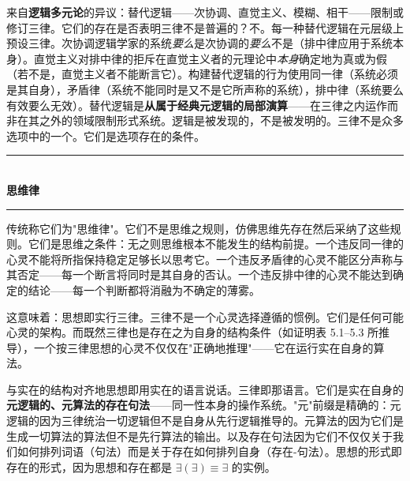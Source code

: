 \documentclass[10pt, openany, oneside]{book}
\renewcommand{\normalsize}{\fontsize{10}{13}\selectfont}
\begin{document}
来自\textbf{逻辑多元论}的异议：替代逻辑——次协调、直觉主义、模糊、相干——限制或修订三律。它们的存在是否表明三律不是普遍的？不。每一种替代逻辑在元层级上预设三律。次协调逻辑学家的系统\textit{要么}是次协调的\textit{要么}不是（排中律应用于系统本身）。直觉主义对排中律的拒斥在直觉主义者的元理论中\textit{本身}确定地为真或为假（若不是，直觉主义者不能断言它）。构建替代逻辑的行为使用同一律（系统必须是其自身），矛盾律（系统不能同时是又不是它所声称的系统），排中律（系统要么有效要么无效）。替代逻辑是\textbf{从属于经典元逻辑的局部演算}——在三律之内运作而非在其之外的领域限制形式系统。逻辑是被发现的，不是被发明的。三律不是众多选项中的一个。它们是选项存在的条件。

\vspace{1.5em}


\begin{center}
    \rule{0.3\textwidth}{0.4pt}\\[0.5em]
    {\normalsize\bfseries\scshape 思维律}\\[0.3em]
    \rule{0.3\textwidth}{0.4pt}
\end{center}

\vspace{1em}

\noindent 传统称它们为"思维律"。它们不是思维之规则，仿佛思维先存在然后采纳了这些规则。它们是思维之条件：无之则思维根本不能发生的结构前提。一个违反同一律的心灵不能将所指保持稳定足够长以思考它。一个违反矛盾律的心灵不能区分声称与其否定——每一个断言将同时是其自身的否认。一个违反排中律的心灵不能达到确定的结论——每一个判断都将消融为不确定的薄雾。

这意味着：思想即实行三律。三律不是一个心灵选择遵循的惯例。它们是任何可能心灵的架构。而既然三律也是存在之为自身的结构条件（如证明表 5.1--5.3 所推导），一个按三律思想的心灵不仅仅在"正确地推理"——它在运行实在自身的算法。

与实在的结构对齐地思想即用实在的语言说话。三律即那语言。它们是实在自身的\textbf{元逻辑的、元算法的存在句法}——同一性本身的操作系统。"元"前缀是精确的：元逻辑的因为三律统治一切逻辑但不是自身从先行逻辑推导的。元算法的因为它们是生成一切算法的算法但不是先行算法的输出。以及存在句法因为它们不仅仅关于我们如何排列词语（句法）而是关于存在如何排列自身（存在-句法）。思想的形式即存在的形式，因为思想和存在都是 $\exists(\exists) \equiv \exists$ 的实例。

\vspace{1.5em}
\end{document}
